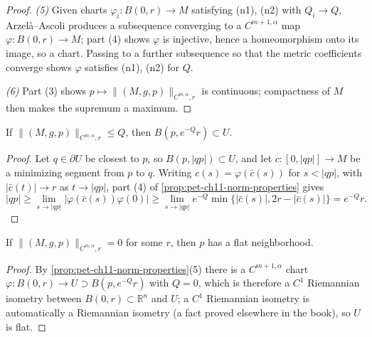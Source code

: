 \begin{proof}
  \emph{(5)} Given charts $\varphi_i:B(0,r)\to M$ satisfying (n1), (n2) with
  $Q_i\to Q$, Arzelà--Ascoli produces a subsequence converging to a
  $C^{m+1,\alpha}$ map $\varphi:B(0,r)\to M$; part (4) shows $\varphi$ is
  injective, hence a homeomorphism onto its image, so a chart. Passing to a
  further subsequence so that the metric coefficients converge shows
  $\varphi$ satisfies (n1), (n2) for $Q$.

  \emph{(6)} Part (3) shows $p\mapsto\|(M,g,p)\|_{C^{m,\alpha},r}$ is
  continuous; compactness of $M$ then makes the supremum a maximum.
\end{proof}

\begin{corollary}
  \label{cor:pet-ch11-norm-bound-ball-containment}
  If $\|(M,g,p)\|_{C^{m,\alpha},r}\le Q$, then $B(p,e^{-Q}r)\subset U$.
\end{corollary}
\begin{proof}
  Let $q\in\partial U$ be closest to $p$, so $B(p,|qp|)\subset U$, and let
  $c:[0,|qp|]\to M$ be a minimizing segment from $p$ to $q$. Writing
  $c(s)=\varphi(\bar c(s))$ for $s<|qp|$, with $|\bar c(t)|\to r$ as
  $t\to|qp|$, part (4) of \cref{prop:pet-ch11-norm-properties} gives
  \[
    |qp|\ge\lim_{s\to|qp|}|\varphi(\bar c(s))\varphi(0)|
    \ge\lim_{s\to|qp|}e^{-Q}\min\{|\bar c(s)|,2r-|\bar c(s)|\}
    =e^{-Q}r.
  \]
\end{proof}

\begin{corollary}
  \label{cor:pet-ch11-norm-zero-implies-flat}
  If $\|(M,g,p)\|_{C^{m,\alpha},r}=0$ for some $r$, then $p$ has a flat
  neighborhood.
\end{corollary}
\begin{proof}
  By \cref{prop:pet-ch11-norm-properties}(5) there is a $C^{m+1,\alpha}$
  chart $\varphi:B(0,r)\to U\supset B(p,e^{-Q}r)$ with $Q=0$, which is
  therefore a $C^1$ Riemannian isometry between $B(0,r)\subset\mathbb{R}^n$ and
  $U$; a $C^1$ Riemannian isometry is automatically a Riemannian isometry (a
  fact proved elsewhere in the book), so $U$ is flat.
\end{proof}

